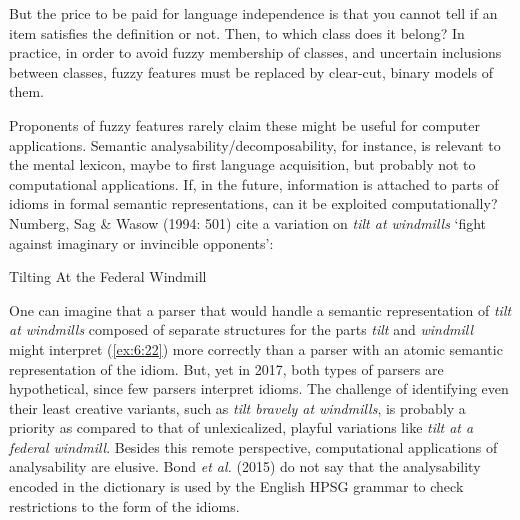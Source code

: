 \documentclass[output=paper]{langsci/langscibook}
\begin{document}
But the price to be paid for language independence is that you cannot tell if an item satisfies the definition or not. Then, to which class does it belong? In practice, in order to avoid fuzzy membership of classes, and uncertain inclusions between classes, fuzzy features must be replaced by clear-cut, binary models of them. 

Proponents of fuzzy features rarely claim these might be useful for computer applications. Semantic analysability\slash decomposability, for instance, is relevant to the mental lexicon, maybe to first language acquisition, but probably not to computational applications. If, in the future, information is attached to parts of idioms in formal semantic representations, can it be exploited computationally? Numberg, Sag \& Wasow (1994: 501) cite a variation on \textit{tilt at windmills} ‘fight against imaginary or invincible opponents’:

\begin{exe}
\ex \label{ex:6:22}
Tilting At the Federal Windmill
\end{exe}
	

\noindent One can imagine that a parser that would handle a semantic representation of\textit{ tilt at windmills} composed of separate structures for the parts \textit{tilt} and \textit{windmill} might interpret (\ref{ex:6:22}) more correctly than a parser with an atomic semantic representation of the idiom. But, yet in 2017, both types of parsers are hypothetical, since few parsers interpret idioms. The challenge of identifying even their least creative variants, such as \textit{tilt bravely at windmills}, is probably a priority as compared to that of unlexicalized, playful variations like \textit{tilt at a federal windmill}. Besides this remote perspective, computational applications of analysability are elusive. Bond \textit{et al.} (2015) do not say that the analysability encoded in the dictionary is used by the English HPSG grammar to check restrictions to the form of the idioms.
\end{document}
